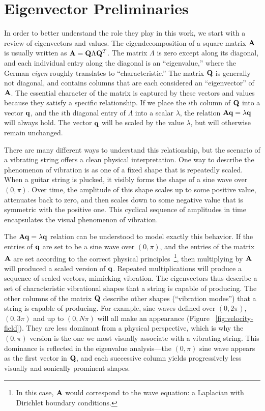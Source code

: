 \section*{Eigenvector Preliminaries}
In order to better understand the role they play in this work, we start with a review of eigenvectors and values. The eigendecomposition of a square matrix $\mathbf{A}$ is usually written as $\mathbf{A} = \mathbf{Q} \Lambda \mathbf{Q}^T$. The matrix $\Lambda$ is zero except along its diagonal, and each individual entry along the diagonal is an ``eigenvalue,'' where the German {\em eigen} roughly translates to ``characteristic.'' The matrix $\mathbf{Q}$ is generally not diagonal, and contains columns that are each considered an ``eigenvector'' of $\mathbf{A}$. The essential character of the matrix is captured by these vectors and values because they satisfy a specific relationship. If we place the $i$th column of $\mathbf{Q}$ into a vector $\mathbf{q}$, and the $i$th diagonal entry of $\Lambda$ into a scalar $\lambda$, the relation $\mathbf{A} \mathbf{q} = \lambda \mathbf{q}$ will always hold. The vector $\mathbf{q}$ will be scaled by the value $\lambda$, but will otherwise remain unchanged.

There are many different ways to understand this relationship, but the scenario of a vibrating string offers a clean physical interpretation. One way to describe the phenomenon of vibration is as one of a fixed shape that is repeatedly scaled. When a guitar string is plucked, it visibly forms the shape of a sine wave over $(0, \pi)$. Over time, the amplitude of this shape scales up to some positive value, attenuates back to zero, and then scales down to some negative value that is symmetric with the positive one. This cyclical sequence of amplitudes in time encapsulates the visual phenomenon of vibration.

The $\mathbf{A} \mathbf{q} = \lambda \mathbf{q}$ relation can be understood to model exactly this behavior. If the entries of $\mathbf{q}$ are set to be a sine wave over $(0, \pi)$, and the entries of the matrix $\mathbf{A}$ are set according to the correct physical principles~\footnote{In this case, $\mathbf{A}$ would correspond to the wave equation: a Laplacian with Dirichlet boundary conditions.}, then multiplying by $\mathbf{A}$ will produced a scaled version of $\mathbf{q}$. Repeated multiplications will produce a sequence of scaled vectors, mimicking vibration. The eigenvectors thus describe a set of characteristic vibrational shapes that a string is capable of producing. The other columns of the matrix $\mathbf{Q}$ describe other shapes (``vibration modes'') that a string is capable of producing. For example, sine waves defined over $(0, 2\pi)$, $(0, 3\pi)$ and up to $(0, N \pi)$ will all make an appearance (Figure ~\ref{fig:velocity-field}). They are less dominant from a physical perspective, which is why the $(0, \pi)$ version is the one we most visually associate with a vibrating string. This dominance is reflected in the eigenvalue analysis---the $(0, \pi)$ sine wave appears as the first vector in $\mathbf{Q}$, and each successive column yields progressively less visually and sonically prominent shapes.

